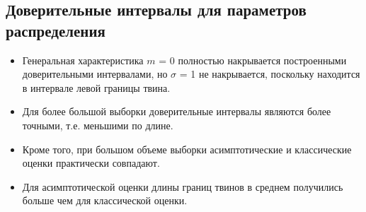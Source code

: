 \subsection{Доверительные интервалы для параметров распределения}
\begin{itemize}
	\item Генеральная характеристика $m$ = 0 полностью накрывается построенными доверительными интервалами, но $\sigma$ = 1 не накрывается, поскольку находится в интервале левой границы твина.
	\item Для более большой выборки доверительные интервалы являются более точными, т.е. меньшими по длине.
	\item Кроме того, при большом объеме выборки асимптотические и классические оценки практически совпадают.
	\item Для асимптотической оценки длины границ твинов в среднем получились больше чем для классической оценки.
\end{itemize}

\newpage
